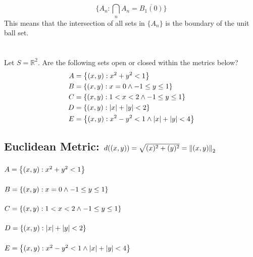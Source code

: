 \documentclass[]{article}
\newcommand{\R}{\mathbb{R}}
\begin{document}
$$\{A_n : \bigcap_n A_n = \overline{B_1(0)}\}$$
This means that the intersection of all sets in $\{A_n\}$ 
is the boundary of the unit ball set.




















\newpage
\section{}
Let $S = \R^2$. Are the following sets open or closed within the metrics below?
\begin{align*}
    A &= \qty{(x,y) : x^2 + y^2 < 1}\\
    B &= \qty{(x,y) : x = 0 \land -1 \leq y \leq 1}\\
    C &= \qty{(x,y) : 1 < x < 2 \land -1 \leq y \leq 1}\\
    D &= \qty{(x,y) : \abs{x} + \abs{y} < 2}\\
    E &= \qty{(x,y) : x^2 - y^2 < 1 \land \abs{x} + \abs{y} < 4}
\end{align*}

\subsection{Euclidean Metric: $d((x,y)) = \sqrt{(x)^2 + (y)^2} = \norm{(x,y)}_2$}
\subsubsection{$A = \qty{(x,y) : x^2 + y^2 < 1}$}
\subsubsection{$B = \qty{(x,y) : x = 0 \land -1 \leq y \leq 1}$}
\subsubsection{$C = \qty{(x,y) : 1 < x < 2 \land -1 \leq y \leq 1}$}
\subsubsection{$D = \qty{(x,y) : \abs{x} + \abs{y} < 2}$}
\subsubsection{$E = \qty{(x,y) : x^2 - y^2 < 1 \land \abs{x} + \abs{y} < 4}$}
\end{document}
